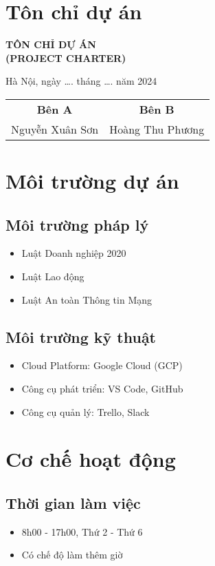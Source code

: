 \section{Tôn chỉ dự án}
\begin{center}
\Large\textbf{TÔN CHỈ DỰ ÁN}\\
\large\textbf{(PROJECT CHARTER)}
\end{center}

\begin{center}
    Hà Nội, ngày …. tháng …. năm 2024 \\
    \begin{tabular}{c c}
        \textbf{Bên A} & \textbf{Bên B} \\
        Nguyễn Xuân Sơn & Hoàng Thu Phương \\
    \end{tabular}
\end{center}
\section{Môi trường dự án}
\subsection{Môi trường pháp lý}
\begin{itemize}
    \item Luật Doanh nghiệp 2020
    \item Luật Lao động
    \item Luật An toàn Thông tin Mạng
\end{itemize}

\subsection{Môi trường kỹ thuật}
\begin{itemize}
    \item Cloud Platform: Google Cloud (GCP)
    \item Công cụ phát triển: VS Code, GitHub
    \item Công cụ quản lý: Trello, Slack
\end{itemize}

\section{Cơ chế hoạt động}
\subsection{Thời gian làm việc}
\begin{itemize}
    \item 8h00 - 17h00, Thứ 2 - Thứ 6
    \item Có chế độ làm thêm giờ
\end{itemize}

